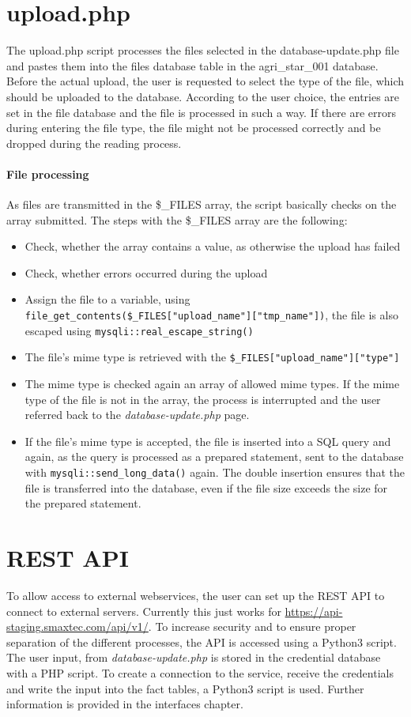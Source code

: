 \section{upload.php}
The upload.php script processes the files selected in the database-update.php file and pastes them into the files database table in the agri\_star\_001 database. Before the actual upload, 
the user is requested to select the type of the file, which should be uploaded to the database. According to the user choice, the entries are set in the file database and the file is processed 
in such a way. If there are errors during entering the file type, the file might not be processed correctly and be dropped during the reading process.
\paragraph{File processing}
As files are transmitted in the \$\_FILES array, the script basically checks on the array submitted. The steps with the \$\_FILES array are the following:
\begin{itemize}
 \item Check, whether the array contains a value, as otherwise the upload has failed
 \item Check, whether errors occurred during the upload
 \item Assign the file to a variable, using\\ \texttt{file\_get\_contents(\$\_FILES["upload\_name"]["tmp\_name"])}, the file is also escaped using \texttt{mysqli::real\_escape\_string()}
 \item The file's mime type is retrieved with the \texttt{\$\_FILES["upload\_name"]["type"]}
 \item The mime type is checked again an array of allowed mime types. If the mime type of the file is not in the array, the process is interrupted and the user referred back to the 
 \emph{database-update.php} page.
 \item If the file's mime type is accepted, the file is inserted into a SQL query and again, as the query is processed as a prepared statement, sent to the database with 
 \texttt{mysqli::send\_long\_data()} again. The double insertion ensures that the file is transferred into the database, even if the file size exceeds the size for the prepared statement.
\end{itemize}

\section{REST API}
To allow access to external webservices, the user can set up the REST API to connect to external servers. Currently this just works for \url{https://api-staging.smaxtec.com/api/v1/}. To increase security and to ensure proper separation of the different processes, the API is accessed using a Python3 script. The user input, from \emph{database-update.php} is stored in the credential database with a PHP script. To create a connection to the service, receive the credentials and write the input into the fact tables, a Python3 script is used. Further information is provided in the interfaces chapter.

